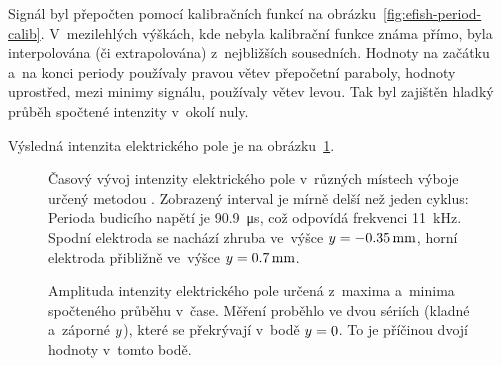Signál byl přepočten pomocí kalibračních funkcí
na obrázku~\ref{fig:efish-period-calib}.
V~mezilehlých výškách, kde nebyla kalibrační funkce známa přímo,
byla interpolována (či extrapolována) z~nejbližších sousedních.
Hodnoty na začátku a~na konci periody používaly pravou větev
přepočetní paraboly,
hodnoty uprostřed, mezi minimy signálu, používaly větev levou.
Tak byl zajištěn hladký průběh spočtené intenzity v~okolí nuly.

Výsledná intenzita elektrického pole je na
obrázku~\ref{fig:efish-period-elfield}.

\begin{figure}[p]
	
	\caption{Časový vývoj intenzity elektrického pole v~různých místech výboje
		určený metodou \EFISH{}.
		Zobrazený interval je mírně delší než jeden cyklus:
		Perioda budicího napětí je \SI{90.9}{\micro\second},
		což odpovídá frekvenci \SI{11}{\kilo\hertz}.
		Spodní elektroda se nachází zhruba ve~výšce
		$y = \SI{-0.35}{\milli\metre}$,
		horní elektroda přibližně ve~výšce
		$y = \SI{0.7}{\milli\metre}$.}
	\label{fig:efish-period-elfield}
\end{figure}

\begin{figure}[htp]
	\centering
	
	\caption{Amplituda intenzity elektrického pole určená z~maxima
		a~minima spočteného průběhu v~čase.
		Měření proběhlo ve dvou sériích (kladné a~záporné $y$),
		které se překrývají v~bodě $y = 0$.
		To je příčinou dvojí hodnoty v~tomto bodě.}
	\label{fig:efish-period-amplitude}
\end{figure}
